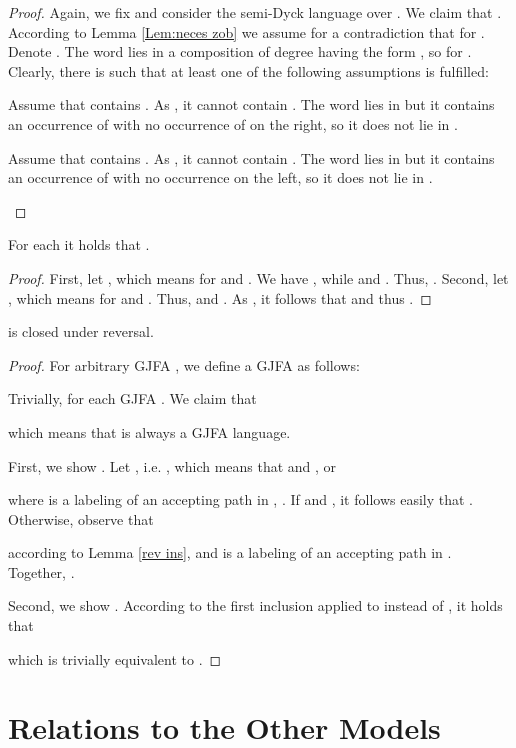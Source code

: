 \documentclass{ws-ijmpc}
\begin{document}
\begin{proof}
Again, we fix 
and consider the semi-Dyck language  over
. We claim that .
According to Lemma \ref{Lem:neces zob} we assume for a contradiction
that 
for . Denote .
The word  lies in a composition  of degree  having the
form , so  for .
Clearly, there is  such that at
least one of the following assumptions is fulfilled:
\begin{romanlist}
\item Assume that  contains . As , it cannot
contain . The word  lies in  but
it contains an occurrence of  with no occurrence of 
on the right, so it does not lie in .
\item Assume that  contains . As ,
it cannot contain . The word  lies in  but it
contains an occurrence of  with no occurrence 
on the left, so it does not lie in .
\end{romanlist}
\end{proof}
\begin{lemma}
\label{rev ins}For each  it holds that .\end{lemma}
\begin{proof}
First, let , which means
 for  and .
We have ,
while  and .
Thus, . Second, let
, which means 
for  and . Thus,
 and .
As ,
it follows that  and thus . \end{proof}
\begin{theorem}
\label{thm:gjfa reversal} is closed under reversal.\end{theorem}
\begin{proof}
For arbitrary GJFA , we define a GJFA
 as follows: 

Trivially, 
for each GJFA . We claim that 

which means that  is always
a GJFA language.

First, we show .
Let , i.e. ,
which means that  and , or 

where  is a labeling of an accepting path
in , . If  and , it
follows easily that .
Otherwise, observe that 

according to Lemma \ref{rev ins}, and 
is a labeling of an accepting path in .
Together, . 

Second, we show .
According to the first inclusion applied to 
instead of , it holds that


which is trivially equivalent to .
\end{proof}

\section{\label{sec:Relations-to-Other}Relations to the Other Models}
\end{document}
